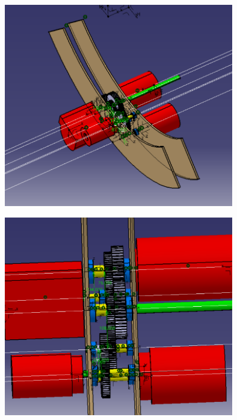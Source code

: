 \documentclass{config}
\begin{document}
\begin{spacing}{1.2}
\begin{center}
\includegraphics[width=0.75\textwidth]{BE_3D_complet_ARO.PNG}
\end{center}

\begin{center}
\includegraphics[width=0.75\textwidth]{BE_3D_complet_ARO_vue_dessus.PNG}
\end{center}


\end{spacing}
\end{document}
